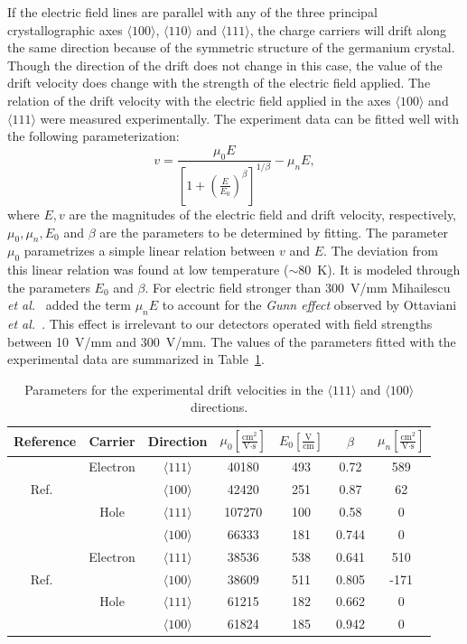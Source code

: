 If the electric field lines are parallel with any of the three principal crystallographic axes $\langle 100 \rangle$, $\langle 110 \rangle$ and $\langle 111 \rangle$, the charge carriers will drift along the same direction because of the symmetric structure of the germanium crystal. Though the direction of the drift does not change in this case, the value of the drift velocity does change with the strength of the electric field applied. The relation of the drift velocity with the electric field applied in the axes $\langle 100 \rangle$ and $\langle 111 \rangle$ were measured experimentally. The experiment data can be fitted well with the following parameterization:
\begin{equation}
\label{eq:pss:para}
v = \frac{\mu_{0}E}{[1+(\frac{E}{E_{0}})^{\beta}]^{1/\beta}} - \mu_{n}E,
\end{equation}
where $E, v$ are the magnitudes of the electric field and drift velocity, respectively, $\mu_{0}, \mu_{n}, E_{0}$ and $\beta$ are the parameters to be determined by fitting. The parameter $\mu_{0}$ parametrizes a simple linear relation between $v$ and $E$. The deviation from this linear relation was found at low temperature ($\sim$80~K). It is modeled through the parameters $E_{0}$ and $\beta$. For electric field stronger than 300~V/mm Mihailescu \textit{et al.}~\cite{miha} added the term $\mu_{n}E$ to account for the \emph{Gunn effect} observed by Ottaviani \textit{et al.}~\cite{otta}. This effect is irrelevant to our detectors operated with field strengths between 10~V/mm and 300~V/mm. The values of the parameters fitted with the experimental data are summarized in Table~\ref{tab:pss:pars}. 

\begin{table}[tbhp]
\centering
\caption{Parameters for the experimental drift velocities in the $\langle111\rangle$ and $\langle100\rangle$ directions.}
\label{tab:pss:pars}
\begin{tabular*}{\textwidth}{ccccccc}\hline\hline
Reference & Carrier & Direction & $\mu_{0} \left[ \frac{\mbox{cm}^{2}}{\mbox{V}\cdot\mbox{s}} \right]$ & $E_{0} \left[ \frac{\mbox{V}}{\mbox{cm}} \right]$ & $\beta$ & $\mu_{n} \left[ \frac{\mbox{cm}^{2}}{\mbox{V}\cdot\mbox{s}} \right]$ \\\hline
& Electron & $\langle111\rangle$ & 40180 & 493 & 0.72 & 589 \\
Ref.~\cite{miha}& & $\langle100\rangle$ & 42420 & 251 & 0.87 & 62\\
& Hole & $\langle111\rangle$ & 107270 & 100 & 0.58 & 0 \\
& & $\langle100\rangle$ & 66333 & 181 & 0.744 & 0 \\\hline
& Electron & $\langle111\rangle$ & 38536 & 538 & 0.641 & 510 \\
Ref.~\cite{bart}& & $\langle100\rangle$ & 38609 & 511 & 0.805 & -171\\ 
& Hole & $\langle111\rangle$ & 61215 & 182 & 0.662 & 0 \\
& & $\langle100\rangle$ & 61824 & 185 & 0.942 & 0 \\\hline\hline
\end{tabular*}
\end{table}

